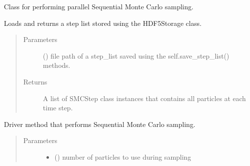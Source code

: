 \documentclass[letterpaper,10pt,english]{sphinxmanual}
\begin{document}
\begin{fulllineitems}
\label{\detokenize{source_code:smcpy.smc.smc_sampler.SMCSampler}}
Class for performing parallel Sequential Monte Carlo sampling.

\begin{fulllineitems}
\label{\detokenize{source_code:smcpy.smc.smc_sampler.SMCSampler.load_step_list}}
Loads and returns a step list stored using the HDF5Storage
class.
\begin{quote}\begin{description}
\item[{Parameters}] \leavevmode
{} () \textendash{} file path of a step\_list saved using the
self.save\_step\_list() methods.

\item[{Returns}] \leavevmode
A list of SMCStep class instances that contains all particles
at each time step.

\end{description}\end{quote}

\end{fulllineitems}


\begin{fulllineitems}
\label{\detokenize{source_code:smcpy.smc.smc_sampler.SMCSampler.sample}}
Driver method that performs Sequential Monte Carlo sampling.
\begin{quote}\begin{description}
\item[{Parameters}] \leavevmode\begin{itemize}
\item {} 
 () \textendash{} number of particles to use during sampling


\end{itemize}
\end{description}
\end{quote}
\end{fulllineitems}
\end{fulllineitems}
\end{document}
